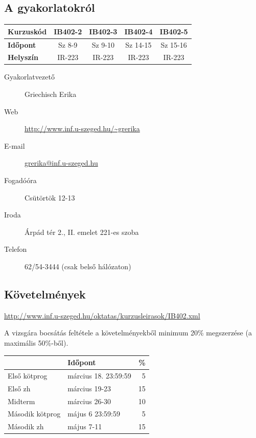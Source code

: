 \subsection*{A gyakorlatokról}

\begin{center}
\begin{tabular}{l|cccc}
\toprule
\bf Kurzuskód	&\bf IB402-2&\bf IB402-3&\bf IB402-4	&\bf IB402-5\\
\midrule
\bf Időpont		& Sz 8-9		& Sz 9-10	& Sz 14-15		& Sz 15-16	\\
\bf Helyszín	& IR-223	&IR-223		& IR-223		& IR-223\\
\bottomrule
\end{tabular}
\end{center}

\begin{description}
\item[Gyakorlatvezető] Griechisch Erika
\item[Web] \url{http://www.inf.u-szeged.hu/~grerika}
\item[E-mail] \href{mailto:grerika@inf.u-szeged.hu}{grerika@inf.u-szeged.hu}
\item[Fogadóóra] Csütörtök 12-13
\item[Iroda] Árpád tér 2., II. emelet 221-es szoba
\item[Telefon] 62/54-3444 (csak belső hálózaton)
\end{description}


\subsection*{Követelmények}
\begin{center}
 \url{http://www.inf.u-szeged.hu/oktatas/kurzusleirasok/IB402.xml}
\end{center}



A vizsgára bocsátás feltétele a követelményekből minimum 20\% megszerzése (a maximális 50\%-ből). 
\bigskip

\begin{center}
\begin{tabular}{llr}
\toprule
			& \bf Időpont		& \%
			\\
			\midrule
Első kötprog 		&március 18. 23:59:59	& 5\\
Első zh 		&március 19-23		&15\\
Midterm 		&március 26-30		&10\\
Második kötprog 	&május 6 23:59:59	&5\\
Második zh 		&május 7-11		&15\\
\bottomrule
\end{tabular}
\end{center}
\bigskip

